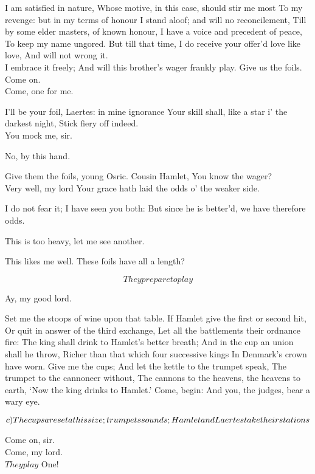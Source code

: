\documentclass[11pt]{book}
\begin{document}
\7	I am satisfied in nature,
	Whose motive, in this case, should stir me most
	To my revenge: but in my terms of honour
	I stand aloof; and will no reconcilement,
	Till by some elder masters, of known honour,
	I have a voice and precedent of peace,
	To keep my name ungored. But till that time,
	I do receive your offer'd love like love,
	And will not wrong it. \\

\1	I embrace it freely;
	And will this brother's wager frankly play.
	Give us the foils. Come on. \\

\7	Come, one for me.

\1	I'll be your foil, Laertes: in mine ignorance
	Your skill shall, like a star i' the darkest night,
	Stick fiery off indeed. \\

\7	You mock me, sir.

\1	No, by this hand.

\2	Give them the foils, young Osric. Cousin Hamlet,
	You know the wager? \\

\1	Very well, my lord
	Your grace hath laid the odds o' the weaker side.

\2	I do not fear it; I have seen you both:
	But since he is better'd, we have therefore odds.

\7	This is too heavy, let me see another.

\1	This likes me well. These foils have all a length?

	\[They prepare to play\]

	Ay, my good lord.

\2  Set me the stoops of wine upon that table.
	If Hamlet give the first or second hit,
	Or quit in answer of the third exchange,
	Let all the battlements their ordnance fire:
	The king shall drink to Hamlet's better breath;
	And in the cup an union shall he throw,
	Richer than that which four successive kings
	In Denmark's crown have worn. Give me the cups;
	And let the kettle to the trumpet speak,
	The trumpet to the cannoneer without,
	The cannons to the heavens, the heavens to earth,
	`Now the king drinks to Hamlet.' Come, begin:
	And you, the judges, bear a wary eye.

   \(c)The cups are set at his size; trumpets sounds;\\
    Hamlet and Laertes take their stations\)

\1 Come on, sir. \\
\7	          Come, my lord. \\
	\(They play\)
\1	One! \\
\end{document}
